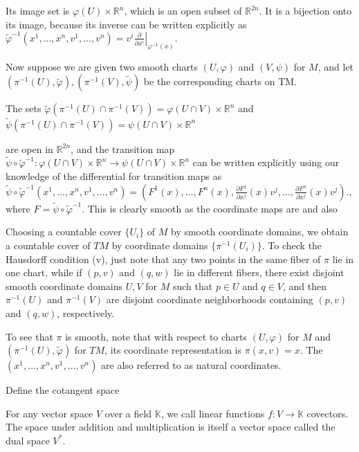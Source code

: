 Its image set is \(\varphi(U) \times \mathbb{R}^n\), which is an open subset of \(\mathbb{R}^{2n}\). 
It is a bijection onto its image, because its inverse can be written explicitly as
\(\tilde{\varphi}^{-1}(x^1, \dots, x^n, v^1, \dots, v^n) = \left. v^i \frac{\partial}{\partial x^i} \right|_{\varphi^{-1}(x)}.\)

Now suppose we are given two smooth charts \((U, \varphi)\) and \((V, \psi)\) for \(M\), 
and let \((\pi^{-1}(U), \tilde{\varphi}), (\pi^{-1}(V), \tilde{\psi})\) be the corresponding charts on TM. 

The sets 
\(\tilde{\varphi}(\pi^{-1}(U) \cap \pi^{-1}(V)) = \varphi(U \cap V) \times \mathbb{R}^n\) and
\(\tilde{\psi}(\pi^{-1}(U) \cap \pi^{-1}(V)) = \psi(U \cap V) \times \mathbb{R}^n\)

are open in \(\mathbb{R}^{2n}\), and the transition map 
\(\tilde{\psi} \circ \tilde{\varphi}^{-1}: \varphi(U \cap V) \times \mathbb{R}^n \to \psi(U \cap V) \times \mathbb{R}^n\) 
can be written explicitly using our knowledge of the differential for transition maps as
\(\tilde{\psi} \circ \tilde{\varphi}^{-1} (x^1, \dots, x^n, v^1, \dots, v^n) 
= \left( F^1(x), \dots, F^n(x), \frac{\partial F^1}{\partial x^j}(x) v^j, \dots, \frac{\partial F^n}{\partial x^j}(x) v^j \right).\),
where \( F = \tilde{\psi} \circ \tilde{\varphi}^{-1} \).
This is clearly smooth as the coordinate maps are and also

Choosing a countable cover \(\{U_i\}\) of \(M\) by smooth coordinate domains, 
we obtain a countable cover of \(TM\) by coordinate domains \(\{\pi^{-1}(U_i)\}\).
To check the Hausdorff condition (v), just note that any two points in the same fiber of \(\pi\) lie in one chart, 
while if \((p, v)\) and \((q, w)\) lie in different fibers, 
there exist disjoint smooth coordinate domains \(U, V\) for \(M\) such that \(p \in U\) and \(q \in V\), 
and then \(\pi^{-1}(U)\) and \(\pi^{-1}(V)\) are disjoint coordinate neighborhoods containing \((p, v)\) and \((q, w)\), respectively.

To see that \(\pi\) is smooth, note that with respect to charts \((U, \varphi)\) for \(M\) and \((\pi^{-1}(U), \tilde{\varphi})\) for \(TM\), 
its coordinate representation is \(\pi(x, v) = x\). The \( (x^1, \dots, x^n, v^1, \dots, v^n) \) are also referred to as natural coordinates.


Define the cotangent space

For any vector space \( V \) over a field \( \mathbb{K} \), we call linear functions \( f : V \to \mathbb{K} \)
covectors. The space under addition and multiplication is itself a vector space called the dual space \( V^\ast \).

